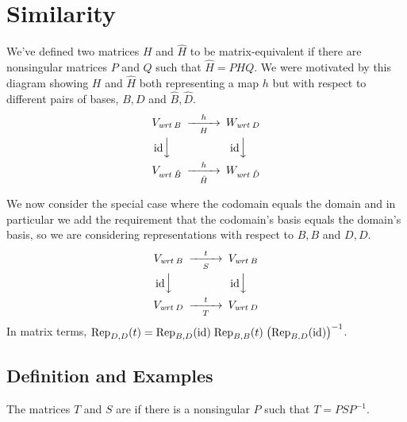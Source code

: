 \section{Similarity}
We've defined two matrices \( H \) and \( \hat{H} \) to be
matrix-equivalent if there are nonsingular matrices \( P \) and \( Q \)
such that \( \hat{H}=PHQ \).
We were motivated by this diagram
showing $H$ and $\hat{H}$ both representing a map 
$h$ but with respect to different
pairs of bases, $B,D$ and $\hat{B},\hat{D}$.
\begin{equation*}
  \begin{CD}
    V_\wrt{B}                   @>h>H>        W_\wrt{D}       \\
    @V{\scriptstyle\identity} VV              @V{\scriptstyle\identity} VV \\
    V_\wrt{\hat{B}}             @>h>\hat{H}>  W_\wrt{\hat{D}}
  \end{CD}
\end{equation*}

We now consider the special case
where the codomain equals the domain and in particular we add the requirement
that the codomain's basis equals the domain's basis,
so we are considering representations with respect to 
$B,B$ and $D,D$.
\begin{equation*}
  \begin{CD}
    V_\wrt{B}                   @>t>S>        V_\wrt{B}       \\
    @V{\scriptstyle\identity} VV              @V{\scriptstyle\identity} VV \\
    V_\wrt{D}                   @>t>T>        V_\wrt{D}
  \end{CD}
\end{equation*}
In matrix terms, 
\(\rep{t}{D,D}
  =\rep{\identity}{B,D}\;\rep{t}{B,B}\;\bigl(\rep{\identity}{B,D}\bigr)^{-1} \).



\subsection{Definition and Examples}
\begin{definition}
The matrices  \( T \) and $S$ are 
%
if there is a nonsingular \( P \) such that
$
  T=PSP^{-1}
$.
\end{definition}

